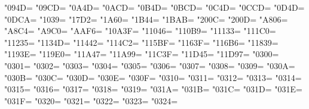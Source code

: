 
\newXeTeXintercharclass\KclassCM
\newXeTeXintercharclass\KclassVir

\XeTeXcharclass"094D=\KclassVir
\XeTeXcharclass"09CD=\KclassVir
\XeTeXcharclass"0A4D=\KclassVir
\XeTeXcharclass"0ACD=\KclassVir
\XeTeXcharclass"0B4D=\KclassVir
\XeTeXcharclass"0BCD=\KclassVir
\XeTeXcharclass"0C4D=\KclassVir
\XeTeXcharclass"0CCD=\KclassVir
\XeTeXcharclass"0D4D=\KclassVir
\XeTeXcharclass"0DCA=\KclassVir
\XeTeXcharclass"1039=\KclassVir
\XeTeXcharclass"17D2=\KclassVir
\XeTeXcharclass"1A60=\KclassVir
\XeTeXcharclass"1B44=\KclassVir
\XeTeXcharclass"1BAB=\KclassVir
\XeTeXcharclass"200C=\KclassVir
\XeTeXcharclass"200D=\KclassVir
\XeTeXcharclass"A806=\KclassVir
\XeTeXcharclass"A8C4=\KclassVir
\XeTeXcharclass"A9C0=\KclassVir
\XeTeXcharclass"AAF6=\KclassVir
\XeTeXcharclass"10A3F=\KclassVir
\XeTeXcharclass"11046=\KclassVir
\XeTeXcharclass"110B9=\KclassVir
\XeTeXcharclass"11133=\KclassVir
\XeTeXcharclass"111C0=\KclassVir
\XeTeXcharclass"11235=\KclassVir
\XeTeXcharclass"1134D=\KclassVir
\XeTeXcharclass"11442=\KclassVir
\XeTeXcharclass"114C2=\KclassVir
\XeTeXcharclass"115BF=\KclassVir
\XeTeXcharclass"1163F=\KclassVir
\XeTeXcharclass"116B6=\KclassVir
\XeTeXcharclass"11839=\KclassVir
\XeTeXcharclass"1193E=\KclassVir
\XeTeXcharclass"119E0=\KclassVir
\XeTeXcharclass"11A47=\KclassVir
\XeTeXcharclass"11A99=\KclassVir
\XeTeXcharclass"11C3F=\KclassVir
\XeTeXcharclass"11D45=\KclassVir
\XeTeXcharclass"11D97=\KclassVir
\XeTeXcharclass"0300=\KclassCM
\XeTeXcharclass"0301=\KclassCM
\XeTeXcharclass"0302=\KclassCM
\XeTeXcharclass"0303=\KclassCM
\XeTeXcharclass"0304=\KclassCM
\XeTeXcharclass"0305=\KclassCM
\XeTeXcharclass"0306=\KclassCM
\XeTeXcharclass"0307=\KclassCM
\XeTeXcharclass"0308=\KclassCM
\XeTeXcharclass"0309=\KclassCM
\XeTeXcharclass"030A=\KclassCM
\XeTeXcharclass"030B=\KclassCM
\XeTeXcharclass"030C=\KclassCM
\XeTeXcharclass"030D=\KclassCM
\XeTeXcharclass"030E=\KclassCM
\XeTeXcharclass"030F=\KclassCM
\XeTeXcharclass"0310=\KclassCM
\XeTeXcharclass"0311=\KclassCM
\XeTeXcharclass"0312=\KclassCM
\XeTeXcharclass"0313=\KclassCM
\XeTeXcharclass"0314=\KclassCM
\XeTeXcharclass"0315=\KclassCM
\XeTeXcharclass"0316=\KclassCM
\XeTeXcharclass"0317=\KclassCM
\XeTeXcharclass"0318=\KclassCM
\XeTeXcharclass"0319=\KclassCM
\XeTeXcharclass"031A=\KclassCM
\XeTeXcharclass"031B=\KclassCM
\XeTeXcharclass"031C=\KclassCM
\XeTeXcharclass"031D=\KclassCM
\XeTeXcharclass"031E=\KclassCM
\XeTeXcharclass"031F=\KclassCM
\XeTeXcharclass"0320=\KclassCM
\XeTeXcharclass"0321=\KclassCM
\XeTeXcharclass"0322=\KclassCM
\XeTeXcharclass"0323=\KclassCM
\XeTeXcharclass"0324=\KclassCM
